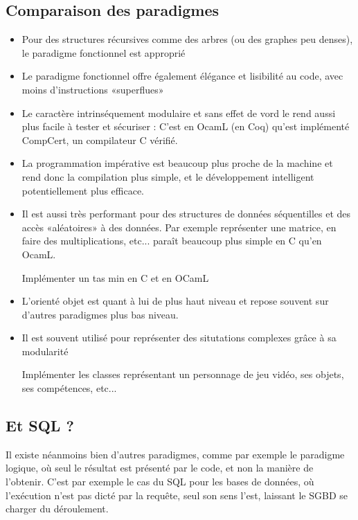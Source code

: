 \subsection{Comparaison des paradigmes}
	\begin{itemize}[label=$\star$]
		\item Pour des structures récursives comme des arbres (ou des graphes peu denses), le paradigme fonctionnel est approprié
		\item Le paradigme fonctionnel offre également élégance et lisibilité au code, avec moins d'instructions «superflues»
		\item Le caractère intrinséquement modulaire et sans effet de vord le rend aussi plus facile à tester et sécuriser : C'est en OcamL (en Coq) qu'est implémenté CompCert, un compilateur C vérifié.
		\item La programmation impérative est beaucoup plus proche de la machine et rend donc la compilation plus simple, et le développement intelligent potentiellement plus efficace.
		\item Il est aussi très performant pour des structures de données séquentilles et des accès «aléatoires» à des données. Par exemple représenter une matrice, en faire des multiplications, etc... paraît beaucoup plus simple en C qu'en OcamL.
		\begin{exercise}
			Implémenter un tas min en C et en OCamL
		\end{exercise}
		\item L'orienté objet est quant à lui de plus haut niveau et repose souvent sur d'autres paradigmes plus bas niveau.
		\item Il est souvent utilisé pour représenter des situtations complexes grâce à sa modularité
		\begin{exercise}
			Implémenter les classes représentant un personnage de jeu vidéo, ses objets, ses compétences, etc...
		\end{exercise}
	\end{itemize}

\subsection{Et SQL ?}

	Il existe néanmoins bien d'autres paradigmes, comme par exemple le paradigme logique, où seul le résultat est présenté par le code, et non la manière de l'obtenir. C'est par exemple le cas du SQL pour les bases de données, où l'exécution n'est pas dicté par la requête, seul son sens l'est, laissant le SGBD se charger du déroulement.